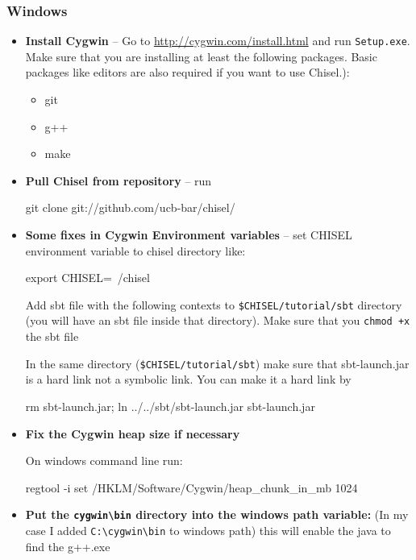 \documentclass[twocolumn, 10pt]{article}
\begin{document}
\subsubsection{Windows}

\begin{itemize}
\item \textbf{Install Cygwin} --
Go to \url{http://cygwin.com/install.html} and run \verb+Setup.exe+.
Make sure that you are installing at least the following packages.  Basic packages like editors are also required if you want to use Chisel.):
\begin{itemize}
\item git
\item g++
\item make
\end{itemize}
\item \textbf{Pull Chisel from repository} -- run
\begin{bash}
git clone git://github.com/ucb-bar/chisel/
\end{bash}
\item \textbf{Some fixes in Cygwin Environment variables} --
set CHISEL environment variable to chisel directory
like: 
\begin{bash}
export CHISEL=~/chisel
\end{bash}
Add sbt file with the following contexts to \verb+$CHISEL/tutorial/sbt+ directory (you will have an sbt file inside that directory). Make sure that you \verb!chmod +x! the sbt file


In the same directory (\verb+$CHISEL/tutorial/sbt+) make sure that sbt-launch.jar is a hard link not a symbolic link. You can make it a hard link by
\begin{bash}
rm sbt-launch.jar; ln ../../sbt/sbt-launch.jar sbt-launch.jar
\end{bash}

\item \textbf{Fix the Cygwin heap size if necessary}


On windows command line run:

\begin{bash}
regtool -i set /HKLM/Software/Cygwin/heap_chunk_in_mb 1024
\end{bash}

\item {\bf Put the \verb+cygwin\bin+ directory into the windows path variable:}
(In my case I added \verb+C:\cygwin\bin+ to windows path) this will enable the java to find the g++.exe
\end{itemize}
\end{document}
